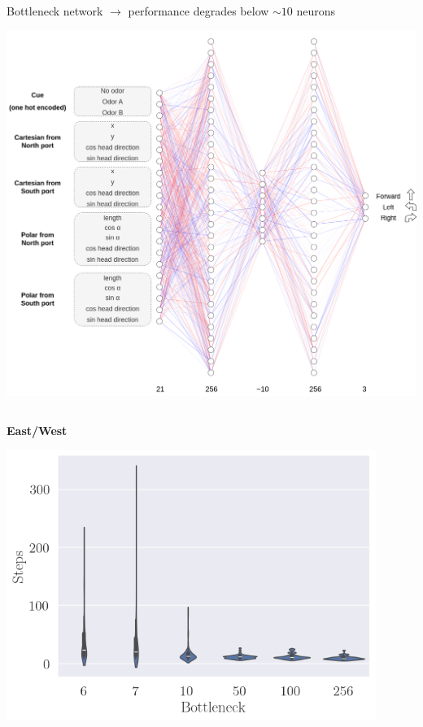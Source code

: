 \documentclass[bigger]{beamer}
\begin{document}
\begin{frame}[label={sec:orgd11d452}]{Bottleneck network \(\to\) performance degrades below \(\sim\!10\) neurons}
\begin{center}
\includegraphics[height=0.4\textheight]{medias/NN-architecture-bottleneck.drawio.png}
\end{center}
\vspace{-3em}
\begin{columns}
\begin{column}[c]{0.5\columnwidth}
\begin{center}
\small
\textbf{East/West}\\
\end{center}
\begin{center}
\includegraphics[width=0.9\textwidth]{medias/steps-boxplot-EastWest.png}

\end{center}
\end{column}
\end{columns}
\end{frame}
\end{document}

